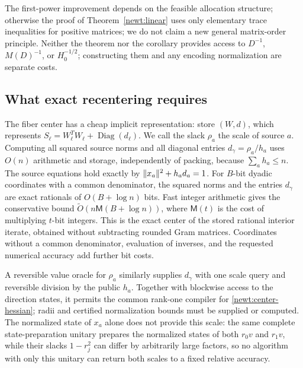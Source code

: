 The first-power improvement depends on the feasible allocation
structure; otherwise the proof of Theorem~\ref{newt:linear} uses only elementary trace inequalities for
positive matrices; we do not claim a new general matrix-order principle.
Neither the theorem nor the corollary provides access to $D^{-1}$,
$M(D)^{-1}$, or $H_0^{-1/2}$; constructing them and any encoding
normalization are separate costs.

\subsection{What exact recentering requires}

The fiber center has a cheap implicit representation: store $(W,d)$,
which represents $S_\ell=W_\ell^TW_\ell+\operatorname{Diag}(d_\ell)$.
We call the slack $\rho_a$ the scale of source $a$.  Computing all
squared source norms and all diagonal entries $d_\gamma=\rho_a/h_a$ uses $O(n)$ arithmetic and storage, independently
of packing, because $\sum_a h_a\leq n$.  The source equations hold
exactly by $\lVert x_a\rVert^2+h_ad_a=1$.  For $B$-bit dyadic coordinates
with a common denominator, the squared norms and the entries $d_\gamma$
are exact rationals of $O(B+\log n)$ bits.  Fast integer arithmetic
gives the conservative bound $\widetilde O(n\mathsf M(B+\log n))$, where
$\mathsf M(t)$ is the cost of multiplying $t$-bit integers.  This is the
exact center of the stored rational interior iterate, obtained without
subtracting rounded Gram matrices.  Coordinates without a common
denominator, evaluation of inverses, and the requested numerical
accuracy add further bit costs.

A reversible value oracle for $\rho_a$ similarly supplies $d_\gamma$
with one scale query and reversible division by the public $h_a$.
Together with blockwise access to the direction states, it permits the
common rank-one compiler for \eqref{newt:center-hessian}; radii and
certified normalization bounds must be supplied or computed.  The
normalized state of $x_a$ alone does not provide this scale: the
same complete state-preparation unitary prepares the normalized states of
both $r_0v$ and $r_1v$, while their slacks $1-r_j^2$ can differ by
arbitrarily large factors, so no algorithm with only this unitary can
return both scales to a fixed relative accuracy.

